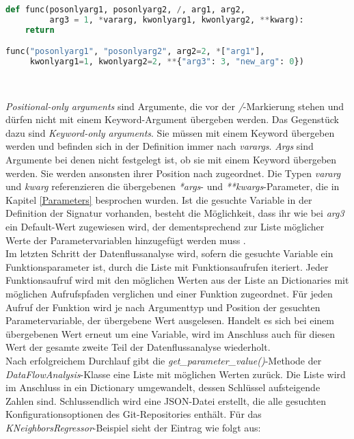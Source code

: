 \documentclass[german,bachelor]{swsLeipzig}
\begin{document}
\noindent\begin{minipage}{\linewidth}
\begin{lstlisting}[language=Python, frame=single, basicstyle=\small, label=args, caption={Parametertypen von Funktionen},captionpos=b]
def func(posonlyarg1, posonlyarg2, /, arg1, arg2,
         arg3 = 1, *vararg, kwonlyarg1, kwonlyarg2, **kwarg):
    return

func("posonlyarg1", "posonlyarg2", arg2=2, *["arg1"],
     kwonlyarg1=1, kwonlyarg2=2, **{"arg3": 3, "new_arg": 0})
\end{lstlisting}
\end{minipage}
\

\noindent \textit{Positional-only arguments} sind Argumente, die vor der \textit{/}-Markierung stehen und dürfen nicht mit einem
Keyword-Argument übergeben werden.
Das Gegenstück dazu sind \textit{Keyword-only arguments}.
Sie müssen mit einem Keyword übergeben werden und befinden sich in der Definition immer nach \textit{varargs}.
\textit{Args} sind Argumente bei denen nicht festgelegt ist, ob sie mit einem Keyword übergeben werden.
Sie werden ansonsten ihrer Position nach zugeordnet.
Die Typen \textit{vararg} und \textit{kwarg} referenzieren die übergebenen \textit{*args}- und \textit{**kwargs}-Parameter,
die in Kapitel \ref{Parameters} besprochen wurden.
Ist die gesuchte Variable in der Definition der Signatur vorhanden, besteht die Möglichkeit, dass ihr wie bei \textit{arg3} ein Default-Wert
zugewiesen wird, der dementsprechend zur Liste möglicher Werte der Parametervariablen hinzugefügt werden muss \cite[]{9425916}.\\
\indent Im letzten Schritt der Datenflussanalyse wird, sofern die gesuchte Variable ein Funktionsparameter ist,
durch die Liste mit Funktionsaufrufen iteriert.
Jeder Funktionsaufruf wird mit den möglichen Werten aus der Liste an Dictionaries mit möglichen Aufrufspfaden verglichen und
einer Funktion zugeordnet.
Für jeden Aufruf der Funktion wird je nach Argumenttyp und Position der gesuchten Parametervariable, der übergebene
Wert ausgelesen.
Handelt es sich bei einem übergebenen Wert erneut um eine Variable, wird im Anschluss auch für diesen Wert
der gesamte zweite Teil der Datenflussanalyse wiederholt. \\

Nach erfolgreichem Durchlauf gibt die \textit{get\_parameter\_value()}-Methode der \textit{DataFlowAnalysis}-Klasse
eine Liste mit möglichen Werten zurück.
Die Liste wird im Anschluss in ein Dictionary umgewandelt, dessen Schlüssel aufsteigende Zahlen sind.
Schlussendlich wird eine JSON-Datei erstellt, die alle gesuchten Konfigurationsoptionen des Git-Repositories enthält.
Für das \textit{KNeighborsRegressor}-Beispiel sieht der Eintrag wie folgt aus: \\
\end{document}
